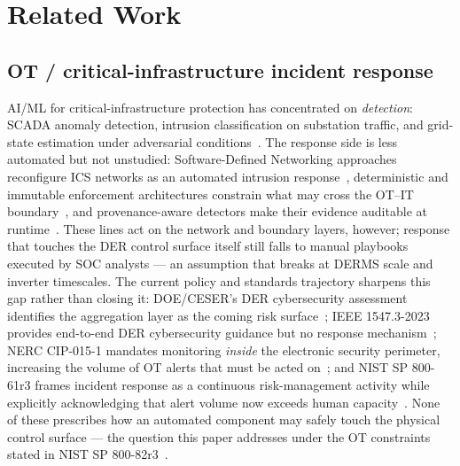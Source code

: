 \section{Related Work}
\label{sec:relatedwork}

\subsection{OT / critical-infrastructure incident response}
\label{sec:rw-ot}
AI/ML for critical-infrastructure protection has concentrated on
\emph{detection}: SCADA anomaly detection, intrusion classification on
substation traffic, and grid-state estimation under adversarial
conditions~\cite{Banad2025_AI_ML_SG,Aslam2025_AI_ICS,Hasan2024_ML_SG_CPS,Berghout2022_ML_SG_Cyber}.
The response side is less automated but not unstudied: Software-Defined
Networking approaches reconfigure ICS networks as an automated intrusion
response~\cite{Etxezarreta2023_SDN_IR}, deterministic and immutable
enforcement architectures constrain what may cross the OT--IT
boundary~\cite{Yenikaya2026_OTIT_Enforcement}, and provenance-aware
detectors make their evidence auditable at
runtime~\cite{Zhang2026_GridPRISM}. These lines act on the network and
boundary layers, however; response that touches the DER control surface
itself still falls to manual playbooks executed by SOC analysts --- an
assumption that breaks at DERMS scale and inverter timescales. The
current policy and standards trajectory sharpens this gap rather than
closing it: DOE/CESER's DER cybersecurity assessment identifies the
aggregation layer as the coming risk surface~\cite{DOE_CESER_DER2022};
IEEE 1547.3-2023 provides end-to-end DER cybersecurity guidance but no
response mechanism~\cite{IEEE15473_2023}; NERC CIP-015-1 mandates
monitoring \emph{inside} the electronic security perimeter, increasing
the volume of OT alerts that must be acted on~\cite{NERC_CIP015_2024};
and NIST SP 800-61r3 frames incident response as a continuous
risk-management activity while explicitly acknowledging that alert
volume now exceeds human capacity~\cite{NIST80061r3}. None of these
prescribes how an automated component may safely touch the physical
control surface --- the question this paper addresses under the OT
constraints stated in NIST SP 800-82r3~\cite{NIST80082r3}.

